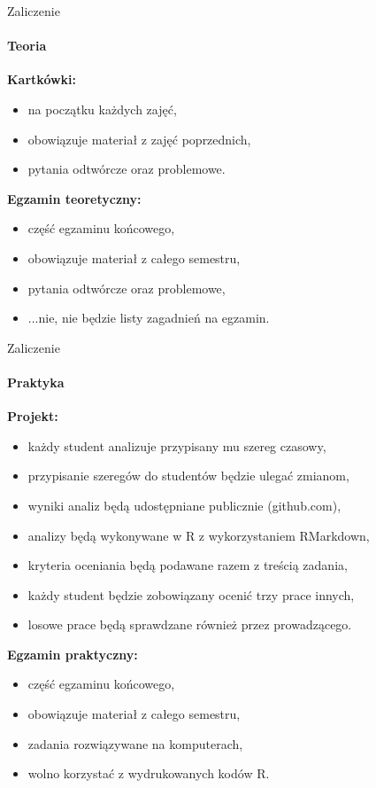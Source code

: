 \documentclass[a4paper, 11pt]{beamer}
\begin{document}
	\begin{frame}{Zaliczenie}
		\framesubtitle{Teoria}
		\textbf{Kartkówki:}
		\begin{itemize}
			\item na początku każdych zajęć,
			\item obowiązuje materiał z zajęć poprzednich,
			\item pytania odtwórcze oraz problemowe.
		\end{itemize}
		\textbf{Egzamin teoretyczny:}
		\begin{itemize}
			\item część egzaminu końcowego,
			\item obowiązuje materiał z całego semestru,
			\item pytania odtwórcze oraz problemowe,
			\item ...nie, nie będzie listy zagadnień na egzamin.
		\end{itemize}
	\end{frame}
	
	\begin{frame}{Zaliczenie}
		\framesubtitle{Praktyka}
		\textbf{Projekt:}
		\begin{itemize}
			\item każdy student analizuje przypisany mu szereg czasowy,
			\item przypisanie szeregów do studentów będzie ulegać zmianom,
			\item wyniki analiz będą udostępniane publicznie (github.com),
			\item analizy będą wykonywane w R z wykorzystaniem RMarkdown,
			\item kryteria oceniania będą podawane razem z treścią zadania,
			\item każdy student będzie zobowiązany ocenić trzy prace innych,
			\item losowe prace będą sprawdzane również przez prowadzącego.
		\end{itemize}
		\textbf{Egzamin praktyczny:}
		\begin{itemize}
			\item część egzaminu końcowego,
			\item obowiązuje materiał z całego semestru,
			\item zadania rozwiązywane na komputerach,
			\item wolno korzystać z wydrukowanych kodów R.
		\end{itemize}
	\end{frame}
	
\end{document}
